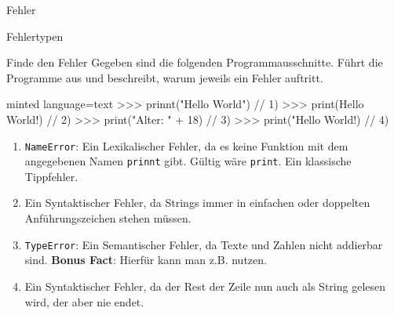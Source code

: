 \begin{task}[points=auto]{Fehler}
\begin{subtask*}[points=0]{Fehlertypen }
\begin{solution}
        \end{solution}
    \end{subtask*}
    \begin{subtask*}[points=0]{Finde den Fehler }
        Gegeben sind die folgenden Programmausschnitte.
        Führt die Programme aus und beschreibt, warum jeweils ein Fehler auftritt.
        \begin{codeBlock}[]{minted language=text}
            >>> prinnt("Hello World")  // 1)
            >>> print(Hello World!)    // 2)
            >>> print("Alter: " + 18)  // 3)
            >>> print("Hello World!)   // 4)
        \end{codeBlock}
        \begin{solution}
            \begin{enumerate}
                \item \texttt{NameError}: Ein \textcolor{TUDa-9b}{Lexikalischer Fehler}, da es keine Funktion mit dem angegebenen Namen
                    \texttt{prinnt} gibt.
                    Gültig wäre \texttt{print}.
                    Ein klassische Tippfehler.
                \item Ein \textcolor{TUDa-9b}{Syntaktischer Fehler},
                    da Strings immer in einfachen oder doppelten Anführungszeichen stehen müssen.
                \item \texttt{TypeError}: Ein \textcolor{TUDa-9b}{Semantischer Fehler}, da Texte und Zahlen nicht addierbar sind.
                    \textbf{Bonus Fact}: Hierfür kann man z.B.  nutzen.
                \item Ein \textcolor{TUDa-9b}{Syntaktischer Fehler}, da der Rest der Zeile nun auch als String gelesen wird, der aber nie endet.
            \end{enumerate}

        \end{solution}
    \end{subtask*}
\end{task}

